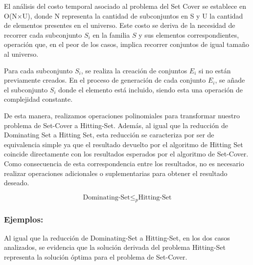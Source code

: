 El análisis del costo temporal asociado al problema del Set Cover se establece en O(N×U), donde N representa la cantidad de subconjuntos en S y U la cantidad de elementos presentes en el universo. Este costo se deriva de la necesidad de recorrer cada subconjunto $S_i$ en la familia $S$ y sus elementos correspondientes, operación que, en el peor de los casos, implica recorrer conjuntos de igual tamaño al universo.

Para cada subconjunto $S_i$, se realiza la creación de conjuntos $E_i$ si no están previamente creados. En el proceso de generación de cada conjunto $E_i$, se añade el subconjunto $S_i$ donde el elemento está incluido, siendo esta una operación de complejidad constante. 

De esta manera, realizamos operaciones polinomiales para transformar nuestro problema de Set-Cover a Hitting-Set. Además, al igual que la reducción de Dominating Set a Hitting Set, esta reducción se caracteriza por ser de equivalencia simple ya que el resultado devuelto por el algoritmo de Hitting Set coincide directamente con los resultados esperados por el algoritmo de Set-Cover. Como consecuencia de esta correspondencia entre los resultados, no es necesario realizar operaciones adicionales o suplementarias para obtener el resultado deseado.


\[\text{Dominating-Set}  \leq _{p} \text{Hitting-Set}\]

\subsubsection{Ejemplos:} 



Al igual que la reducción de Dominating-Set a Hitting-Set, en los dos casos analizados, se evidencia que la solución derivada del problema Hitting-Set representa la solución óptima para el problema de Set-Cover.




